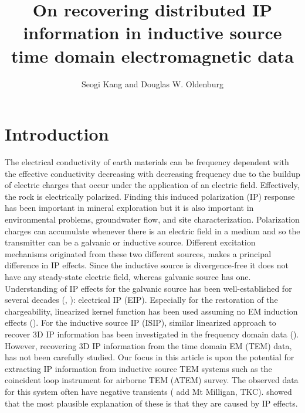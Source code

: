 \documentclass[a4paper, 11pt]{article}
\author{Seogi Kang and Douglas W. Oldenburg}
\title{On recovering distributed IP information in inductive source time domain electromagnetic data}
\begin{document}
\maketitle
\tableofcontents
\clearpage

\section{Introduction}
The electrical conductivity of earth materials can be frequency dependent with the effective conductivity decreasing with decreasing frequency due to the buildup of electric charges that occur under the application of an electric field.
Effectively, the rock is electrically polarized. Finding this induced polarization (IP) response has been important in mineral exploration but it is also important in environmental problems, groundwater flow, and site characterization. 
Polarization charges can accumulate whenever there is an electric field in a medium and so the transmitter can be a galvanic or inductive source. 
Different excitation mechanisms originated from these two different sources, makes a principal difference in IP effects. 
Since the inductive source is divergence-free it does not have any steady-state electric field, whereas galvanic source has one. 
Understanding of IP effects for the galvanic source has been well-established for several decades (\cite{seigel1959}, \cite{seigel1974}): electrical IP (EIP). Especially for the restoration of the chargeability, linearized kernel function has been used assuming no EM induction effects (\cite{doug1994}). For the inductive source IP (ISIP), similar linearized approach to recover 3D IP information has been investigated in the frequency domain data (\cite{Marchant2012b}). However, recovering 3D IP information from the time domain EM (TEM) data, has not been carefully studied. 
Our focus in this article is upon the potential for extracting IP information from inductive source TEM systems such as the coincident loop instrument for airborne TEM (ATEM) survey. The observed data for this system often have negative transients (\cite{Kratzer2012} add Mt Milligan, TKC). \cite{Weidelt1982} showed that the most plausible explanation of these is that they are caused by IP effects. 
\end{document}
